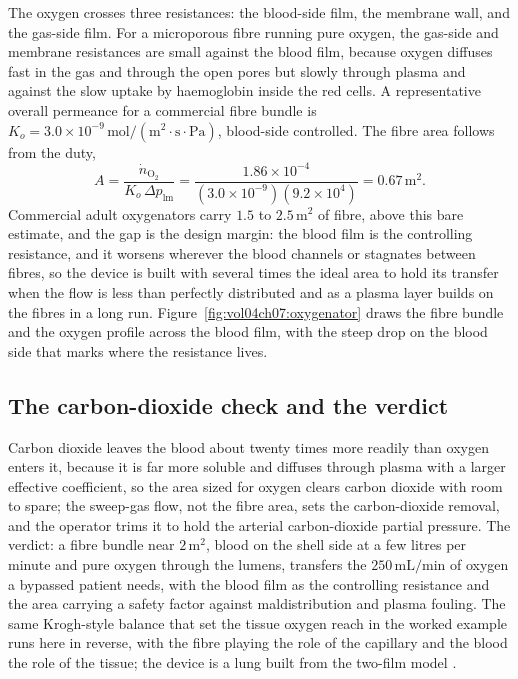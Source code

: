 The oxygen crosses three resistances: the blood-side film, the membrane
wall, and the gas-side film. For a microporous fibre running pure oxygen,
the gas-side and membrane resistances are small against the blood film,
because oxygen diffuses fast in the gas and through the open pores but
slowly through plasma and against the slow uptake by haemoglobin inside
the red cells. A representative overall permeance for a commercial fibre
bundle is $K_o = 3.0\times 10^{-9}\,\text{mol}/(\text{m}^2\cdot\text{s}
\cdot\text{Pa})$, blood-side controlled. The fibre area follows from the
duty,
\[
A = \frac{\dot n_{\text{O}_2}}{K_o\,\Delta p_{\text{lm}}} =
\frac{1.86\times 10^{-4}}{(3.0\times 10^{-9})(9.2\times 10^{4})} =
0.67\,\text{m}^2.
\]
Commercial adult oxygenators carry $1.5$ to $2.5\,\text{m}^2$ of fibre,
above this bare estimate, and the gap is the design margin: the blood film
is the controlling resistance, and it worsens wherever the blood channels
or stagnates between fibres, so the device is built with several times the
ideal area to hold its transfer when the flow is less than perfectly
distributed and as a plasma layer builds on the fibres in a long run.
Figure~\ref{fig:vol04ch07:oxygenator} draws the fibre bundle and the
oxygen profile across the blood film, with the steep drop on the blood
side that marks where the resistance lives.



\subsection*{The carbon-dioxide check and the verdict}

Carbon dioxide leaves the blood about twenty times more readily than
oxygen enters it, because it is far more soluble and diffuses through
plasma with a larger effective coefficient, so the area sized for oxygen
clears carbon dioxide with room to spare; the sweep-gas flow, not the
fibre area, sets the carbon-dioxide removal, and the operator trims it to
hold the arterial carbon-dioxide partial pressure. The verdict: a fibre
bundle near $2\,\text{m}^2$, blood on the shell side at a few litres per
minute and pure oxygen through the lumens, transfers the
$250\,\text{mL/min}$ of oxygen a bypassed patient needs, with the blood
film as the controlling resistance and the area carrying a safety factor
against maldistribution and plasma fouling. The same Krogh-style balance
that set the tissue oxygen reach in the worked example runs here in
reverse, with the fibre playing the role of the capillary and the blood
the role of the tissue; the device is a lung built from the two-film model
\cite{text:bird-transport-phenomena}.

